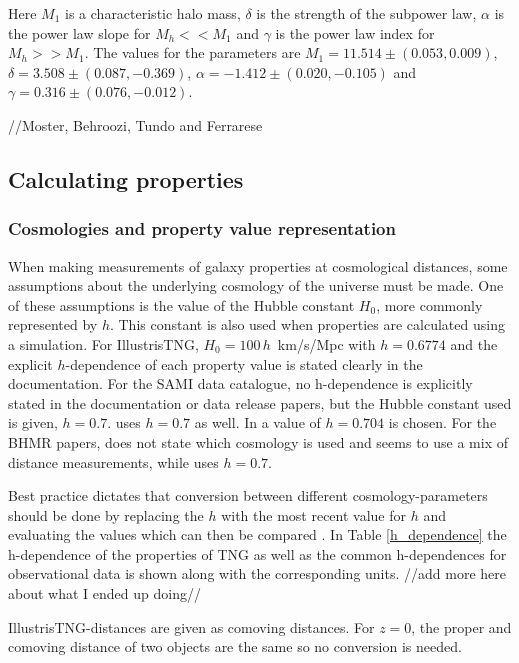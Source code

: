 Here $M_1$ is a characteristic halo mass, $\delta$ is the strength of the subpower law, $\alpha$ is the power law slope for $M_h << M_1$ and $\gamma$ is the power law index for $M_h >> M_1$. The values for the parameters are $M_1 = 11.514\pm(0.053, 0.009)$, $\delta = 3.508 \pm (0.087, -0.369)$, $\alpha = -1.412 \pm (0.020, -0.105)$ and $\gamma = 0.316 \pm (0.076, -0.012)$.


//Moster, Behroozi, Tundo and Ferrarese

\subsection{Calculating properties}

\subsubsection{Cosmologies and property value representation} \label{cosmologies}
When making measurements of galaxy properties at cosmological distances, some assumptions about the underlying cosmology of the universe must be made. One of these assumptions is the value of the Hubble constant $H_0$, more commonly represented by $h$. This constant is also used when properties are calculated using a simulation. For IllustrisTNG, $H_0 = 100\,h\,$ km/s/Mpc with $ h = 0.6774$ and the explicit $h$-dependence of each property value is stated clearly in the documentation. For the SAMI data catalogue, no h-dependence is explicitly stated in the documentation or data release papers, but the Hubble constant used is given, $h = 0.7$.
\cite{Behroozi2013} uses $h = 0.7$ as well. In \cite{Moster2012} a value of $h = 0.704$ is chosen. For the BHMR papers, \cite{Ferrarese2000} does not state which cosmology is used and seems to use a mix of distance measurements, while \cite{Tundo2007} uses $h = 0.7$.

Best practice dictates that conversion between different cosmology-parameters should be done by replacing the $h$ with the most recent value for $h$ and evaluating the values which can then be compared \parencite{Croton2013}. In Table \ref{h_dependence} the h-dependence of the properties of TNG as well as the common h-dependences for observational data is shown along with the corresponding units. //add more here about what I ended up doing//

IllustrisTNG-distances are given as comoving distances. For $z=0$, the proper and comoving distance of two objects are the same so no conversion is needed.

